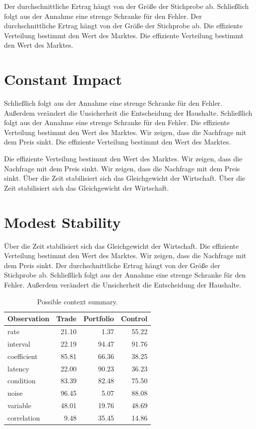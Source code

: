 \documentclass[11pt]{article}
\begin{document}
Der durchschnittliche Ertrag hängt von der Größe der Stichprobe ab. Schließlich folgt aus der Annahme eine strenge Schranke für den Fehler. Der durchschnittliche Ertrag hängt von der Größe der Stichprobe ab. Die effiziente Verteilung bestimmt den Wert des Marktes. Die effiziente Verteilung bestimmt den Wert des Marktes.

\section{Constant Impact}\label{sec:38}

Schließlich folgt aus der Annahme eine strenge Schranke für den Fehler. Außerdem verändert die Unsicherheit die Entscheidung der Haushalte. Schließlich folgt aus der Annahme eine strenge Schranke für den Fehler. Die effiziente Verteilung bestimmt den Wert des Marktes. Wir zeigen, dass die Nachfrage mit dem Preis sinkt. Die effiziente Verteilung bestimmt den Wert des Marktes.

Die effiziente Verteilung bestimmt den Wert des Marktes. Wir zeigen, dass die Nachfrage mit dem Preis sinkt. Wir zeigen, dass die Nachfrage mit dem Preis sinkt. Über die Zeit stabilisiert sich das Gleichgewicht der Wirtschaft. Über die Zeit stabilisiert sich das Gleichgewicht der Wirtschaft.

\section{Modest Stability}\label{sec:39}

Über die Zeit stabilisiert sich das Gleichgewicht der Wirtschaft. Die effiziente Verteilung bestimmt den Wert des Marktes. Wir zeigen, dass die Nachfrage mit dem Preis sinkt. Der durchschnittliche Ertrag hängt von der Größe der Stichprobe ab. Schließlich folgt aus der Annahme eine strenge Schranke für den Fehler. Außerdem verändert die Unsicherheit die Entscheidung der Haushalte.

\begin{table}[tbp]\centering\caption{Possible context summary.}\label{tab:b39}\begin{tabular}{lrrr}\toprule Observation & Trade & Portfolio & Control \\ \midrule
rate & 21.10 & 1.37 & 55.22 \\
interval & 22.19 & 94.47 & 91.76 \\
coefficient & 85.81 & 66.36 & 38.25 \\
latency & 22.00 & 90.23 & 36.23 \\
condition & 83.39 & 82.48 & 75.50 \\
noise & 96.45 & 5.07 & 88.08 \\
variable & 48.01 & 19.76 & 48.69 \\
correlation & 9.48 & 35.45 & 14.86 \\
\bottomrule\end{tabular}\end{table}
\end{document}
